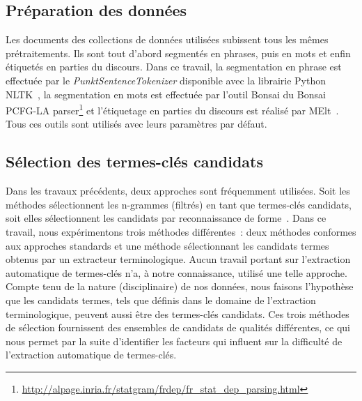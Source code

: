   \subsection{Préparation des données}
  \label{subsec:preparation_des_donnees}
    Les documents des collections de données utilisées subissent tous les mêmes
    prétraitements. Ils sont tout d'abord segmentés en phrases, puis en mots et
    enfin étiquetés en parties du discours. Dans ce travail, la segmentation en
    phrase est effectuée par le \textit{PunktSentenceTokenizer} disponible avec
    la librairie Python NLTK~\cite[\textit{Natural Language
    ToolKit}]{bird2009nltk}, la segmentation en mots est effectuée par l'outil
    Bonsai du Bonsai PCFG-LA
    parser\footnote{\url{http://alpage.inria.fr/statgram/frdep/fr_stat_dep_parsing.html}}
    et l'étiquetage en parties du discours est réalisé par
    MElt~\cite{denis2009melt}. Tous ces outils sont utilisés avec leurs
    paramètres par défaut.

  \subsection{Sélection des termes-clés candidats}
  \label{subsec:extraction_de_termes_cles_candidats}
    Dans les travaux précédents, deux approches sont fréquemment utilisées. Soit
    les méthodes sélectionnent les n-grammes (filtrés) en tant que termes-clés
    candidats, soit elles sélectionnent les candidats par reconnaissance de
    forme~\cite{hulth2003keywordextraction}. Dans ce travail, nous expérimentons
    trois méthodes différentes~: deux méthodes conformes aux approches standards
    et une méthode sélectionnant les candidats termes obtenus par un extracteur
    terminologique. Aucun travail portant sur l'extraction automatique de
    termes-clés n'a, à notre connaissance, utilisé une telle approche. Compte
    tenu de la nature (disciplinaire) de nos données, nous faisons l'hypothèse
    que les candidats termes, tels que définis dans le domaine de l'extraction
    terminologique, peuvent aussi être des termes-clés candidats. Ces trois
    méthodes de sélection fournissent des ensembles de candidats de qualités
    différentes, ce qui nous permet par la suite d'identifier
    les facteurs qui influent sur la difficulté de l'extraction automatique de
    termes-clés.


